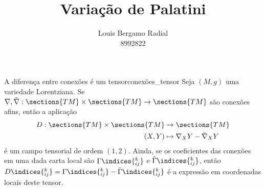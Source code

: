 \documentclass[portuguese]{artigo}
\title{Variação de Palatini}
\author{Louis Bergamo Radial\\8992822}
\begin{document}
\maketitle
\begin{lemma}{A diferença entre conexões é um tensor}{conexões_tensor}
        Seja \((M, g)\) uma variedade Lorentziana. Se \(\nabla, \tilde{\nabla} : \sections{TM} \times \sections{TM} \to \sections{TM}\) são conexões afins, então a aplicação
        \begin{align*}
            D : \sections{TM} \times \sections{TM} &\to \sections{TM}\\
                                             (X,Y) &\mapsto \nabla_XY - \tilde{\nabla}_XY
        \end{align*}
        é um campo tensorial de ordem \((1, 2)\). Ainda, se os coeficientes das conexões em uma dada carta local são \(\Gamma\indices{^k_{ij}}\) e \(\tilde{\Gamma}\indices{^k_{ij}}\), então \(D\indices{^k_{ij}} = \Gamma\indices{^k_{ij}} - \tilde{\Gamma}\indices{^k_{ij}}\) é a expressão em coordenadas locais deste tensor.
    \end{lemma}
\end{document}
